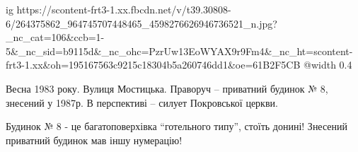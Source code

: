 
 
 
 
 

\ifcmt
  ig https://scontent-frt3-1.xx.fbcdn.net/v/t39.30808-6/264375862_964745707448465_4598276626946736521_n.jpg?_nc_cat=106&ccb=1-5&_nc_sid=b9115d&_nc_ohc=PzrUw13EoWYAX9r9Fm4&_nc_ht=scontent-frt3-1.xx&oh=195167563c9215c18304b5a260746dd1&oe=61B2F5CB
  @width 0.4
\fi


Весна 1983 року. Вулиця Мостицька. Праворуч – приватний будинок № 8, знесений у
1987р. В перспективі – силует Покровської церкви.


Будинок № 8 - це багатоповерхівка \enquote{готельного типу}, стоїть донині! Знесений
приватний будинок мав іншу нумерацію!
